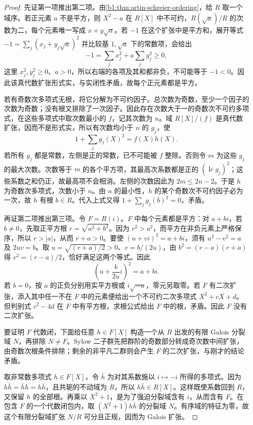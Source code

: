 \begin{proof}
	先证第一项推出第二项。由\cref{b1:thm:artin-schreier-ordering}，给 \(R\) 取一个域序。若正元素 \(a\) 不是平方，则 \(X^2-a\) 在 \(R[X]\) 中不可约，\(R(\sqrt a)/R\) 的次数为二，每个元素唯一写成 \(x+y\sqrt a\)。若 \(-1\) 在这个扩张中是平方和，展开等式 \(-1=\sum_j(x_j+y_j\sqrt a)^2\) 并比较基 \(1,\sqrt a\) 下的常数项，会给出
	\[
		-1=\sum_jx_j^2+a\sum_jy_j^2\ge0,
	\]
	这里 \(x_j^2,y_j^2\geq0\)、\(a>0\)，所以右端的各项及其和都非负，不可能等于 \(-1<0\)。因此该真代数扩张形式实，与实闭性矛盾，故每个正元素都是平方。

	若有奇数次多项式无根，将它分解为不可约因子。总次数为奇数，至少一个因子的次数为奇数；没有根又排除了一次因子。因此存在次数大于一的奇数次不可约多项式，在这些多项式中取次数最小的 \(f\)，记其次数为 \(n\)。域 \(R[X]/(f)\) 是真代数扩张，因而不是形式实，所以有次数均小于 \(n\) 的 \(g_j\)，使
	\[
		1+\sum_jg_j(X)^2=f(X)h(X).
	\]
	若所有 \(g_j\) 都是常数，左侧是正的常数，已不可能被 \(f\) 整除。否则令 \(m\) 为这些 \(g_j\) 的最大次数。次数等于 \(m\) 的各个平方项，其最高次系数都是正的 \((\operatorname{lc}g_j)^2\)；这些系数之和仍正，故最高项不会相消。左侧的次数因此为 \(2m\leq2n-2\)。于是 \(h\) 为奇数次多项式，次数小于 \(n\)。由 \(n\) 的最小性，\(h\) 的某个奇数次不可约因子必为一次，故 \(h\) 有根 \(b\in R\)。代入上式又得 \(1+\sum_jg_j(b)^2=0\)，矛盾。

	再证第二项推出第三项。令 \(F=R(i)\)。\(F\) 中每个元素都是平方：对 \(a+bi\)，若 \(b\ne0\)，先取正平方根 \(r=\sqrt{a^2+b^2}\)。因为 \(r^2>a^2\)，而平方在非负元素上严格保序，所以 \(r>|a|\)，从而 \(r+a>0\)。要使 \((u+vi)^2=a+bi\)，须有 \(u^2-v^2=a\) 及 \(2uv=b\)。取 \(u=\sqrt{(r+a)/2}>0\)、\(v=b/(2u)\)，由 \(b^2=(r-a)(r+a)\) 得 \(v^2=(r-a)/2\)，恰好满足这两个等式。因此
	\[
		\left(u+\frac b{2u}i\right)^2=a+bi.
	\]
	若 \(b=0\)，按 \(a\) 的正负分别用实平方根或 \(i\sqrt{-a}\)，零元另取零。若 \(F\) 有二次扩张，添入其中任一不在 \(F\) 中的元素便给出一个不可约二次多项式 \(X^2+cX+d\)。但判别式 \(c^2-4d\) 在 \(F\) 中有平方根，求根公式给出 \(F\) 中的根，矛盾。因此 \(F\) 没有二次扩张。

	要证明 \(F\) 代数闭，下面给任意 \(h\in F[X]\) 构造一个从 \(R\) 出发的有限 Galois 分裂域 \(N\)，再排除 \(N\ne F\)。Sylow 二子群先把群阶的奇数部分转成奇次数中间扩张，由奇数次根条件排除；剩余的非平凡二群则会产生 \(F\) 的二次扩张，与刚才的结论矛盾。

	取非常数多项式 \(h\in F[X]\)，令 \(\bar h\) 为对其系数施以 \(i\mapsto-i\) 所得的多项式。因为 \(\overline{h\bar h}=\bar h h=h\bar h\)，且共轭的不动域为 \(R\)，所以 \(h\bar h\in R[X]\)。这样既使系数回到 \(R\)，又保留 \(h\) 的全部根。再乘以 \(X^2+1\)，是为了强迫分裂域含有 \(i\)，从而含有 \(F\)。在包含 \(F\) 的一个代数闭包内，取 \((X^2+1)h\bar h\) 的分裂域 \(N\)。有序域的特征为零，故这个有限分裂域扩张 \(N/R\) 可分且正规，因而为 Galois 扩张。


\end{proof}
